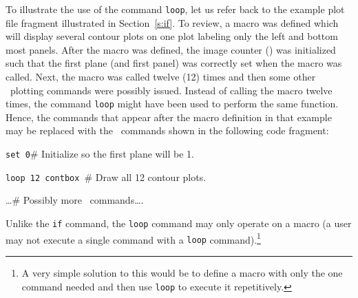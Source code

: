 To illustrate the use of the command {\tt loop}, let us refer
back to the example plot file fragment illustrated in Section~\ref{s:if}.
To review, a macro was defined which will display several
contour plots on one plot labeling only the left and bottom most panels.
After the macro was defined, the image counter () was initialized
such that the first plane (and first panel) was correctly set when the
macro was called.
Next, the macro was called twelve (12) times and then some other
\wip\ plotting commands were possibly issued.
Instead of calling the macro twelve times,
the command {\tt loop} might have been used to perform the same function.
Hence, the commands that appear after the macro definition
in that example may be replaced with the \wip\ commands shown
in the following code fragment:
\begin{wiplist}%
  \item [\wipp] {\tt set  0}\hfill\# Initialize so the first
    plane will be 1.
\samepage
  \item [\wipp] {\tt loop 12 contbox }\hfill\# Draw all 12 contour plots.
  \item [\wipp] \ldots\hfill\# Possibly more \wip\ commands\ldots.
\end{wiplist}

Unlike
the {\tt if}
command,
the {\tt loop}%
command may only operate on a macro
(\ie a user may not execute a single command with a {\tt loop}
command).\footnote{A very simple solution to this would be to define a
macro with only the one command needed and then use {\tt loop} to
execute it repetitively.}

